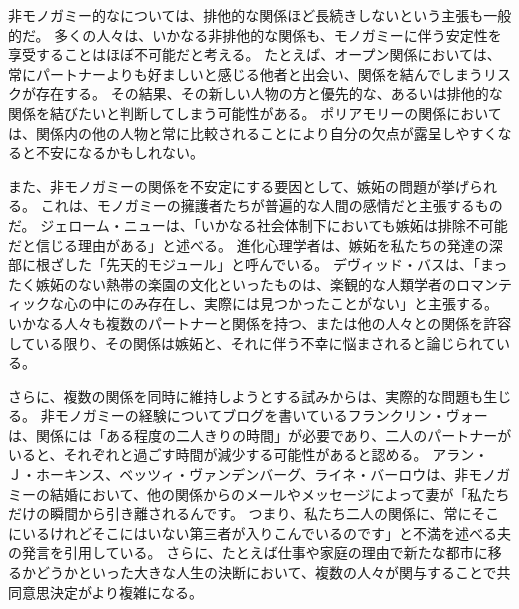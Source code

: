\documentclass[paper=a4,book,openany]{jlreq}
\begin{document}
非モノガミー的なについては、排他的な関係ほど長続きしないという主張も一般的だ。
多くの人々は、いかなる非排他的な関係も、モノガミーに伴う安定性を享受することはほぼ不可能だと考える。
たとえば、オープン関係においては、常にパートナーよりも好ましいと感じる他者と出会い、関係を結んでしまうリスクが存在する。
その結果、その新しい人物の方と優先的な、あるいは排他的な関係を結びたいと判断してしまう可能性がある。
ポリアモリーの関係においては、関係内の他の人物と常に比較されることにより自分の欠点が露呈しやすくなると不安になるかもしれない。

また、非モノガミーの関係を不安定にする要因として、嫉妬の問題が挙げられる。
これは、モノガミーの擁護者たちが普遍的な人間の感情だと主張するものだ。
ジェローム・ニューは、「いかなる社会体制下においても嫉妬は排除不可能だと信じる理由がある」と述べる\citep[p.43]{new00:_jealous_thoug}。
進化心理学者は、嫉妬を私たちの発達の深部に根ざした「先天的モジュール」と呼んでいる。
デヴィッド・バスは、「まったく嫉妬のない熱帯の楽園の文化といったものは、楽観的な人類学者のロマンティックな心の中にのみ存在し、実際には見つかったことがない」と主張する\citep[p.961]{buss01:_human_natur_cultur}。
いかなる人々も複数のパートナーと関係を持つ、または他の人々との関係を許容している限り、その関係は嫉妬と、それに伴う不幸に悩まされると論じられている。

さらに、複数の関係を同時に維持しようとする試みからは、実際的な問題も生じる。
非モノガミーの経験についてブログを書いているフランクリン・ヴォーは、関係には「ある程度の二人きりの時間」が必要であり、二人のパートナーがいると、それぞれと過ごす時間が減少する可能性があると認める\citep{veaux09:_some_musin_time_manag}。
アラン・Ｊ・ホーキンス、ベッツィ・ヴァンデンバーグ、ライネ・バーロウは、非モノガミーの結婚において、他の関係からのメールやメッセージによって妻が「私たちだけの瞬間から引き離されるんです。
つまり、私たち二人の関係に、常にそこにいるけれどそこにはいない第三者が入りこんでいるのです」と不満を述べる夫の発言を引用している\citep{hawkins17:_new_math_consen_nonmon}。
さらに、たとえば仕事や家庭の理由で新たな都市に移るかどうかといった大きな人生の決断において、複数の人々が関与することで共同意思決定がより複雑になる。
\end{document}
